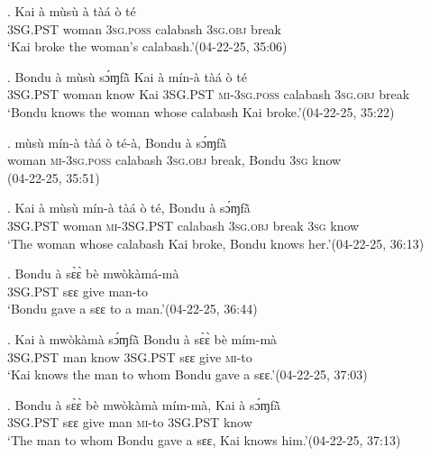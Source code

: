 \documentclass{assets/fieldnotes}
\begin{document}
\exg. Kai à mùsù à tàá ò té\\
{} \textsc{3SG.PST} woman \textsc{3sg.poss} calabash \textsc{3sg.obj} break\\
`Kai broke the woman’s calabash.’\hfill{(04-22-25, 35:06)}

\exg. Bondu à mùsù sɔ́ɱfã̀ Kai à mín-à tàá ò té\\
{} \textsc{3SG.PST} woman know Kai \textsc{3SG.PST} \textsc{mi-3sg.poss} calabash \textsc{3sg.obj} break\\
`Bondu knows the woman whose calabash Kai broke.’\hfill{(04-22-25, 35:22)}

\exg. mùsù mín-à tàá ò té-à, Bondu à sɔ́ɱfã̀\\
woman \textsc{mi-3sg.poss} calabash \textsc{3sg.obj} break, Bondu \textsc{3sg} know\\
\hfill{(04-22-25, 35:51)}

\exg. Kai à mùsù mín-à tàá ò té, Bondu à sɔ́ɱfã̀\\
{} \textsc{3SG.PST} woman \textsc{mi-3SG.PST} calabash \textsc{3sg.obj} break {} \textsc{3sg} know\\
`The woman whose calabash Kai broke, Bondu knows her.’\hfill{(04-22-25, 36:13)}


\exg. Bondu à sɛ̀ɛ̀ bè mwòkàmá-mà\\
{} \textsc{3SG.PST} sɛɛ give man-to\\
`Bondu gave a sɛɛ to a man.’\hfill{(04-22-25, 36:44)}\\

\exg. Kai à mwòkàmà sɔ́ɱfã̀ Bondu à sɛ̀ɛ̀ bè mím-mà\\
{} \textsc{3SG.PST} man know {} \textsc{3SG.PST} sɛɛ give \textsc{mi}-to\\
`Kai knows the man to whom Bondu gave a sɛɛ.’\hfill{(04-22-25, 37:03)}

\exg. Bondu à sɛ̀ɛ̀ bè mwòkàmà mím-mà, Kai à sɔ́ɱfã̀\\
{} \textsc{3SG.PST} sɛɛ give man \textsc{mi}-to {} \textsc{3SG.PST} know\\
`The man to whom Bondu gave a sɛɛ, Kai knows him.’\hfill{(04-22-25, 37:13)}
\end{document}
